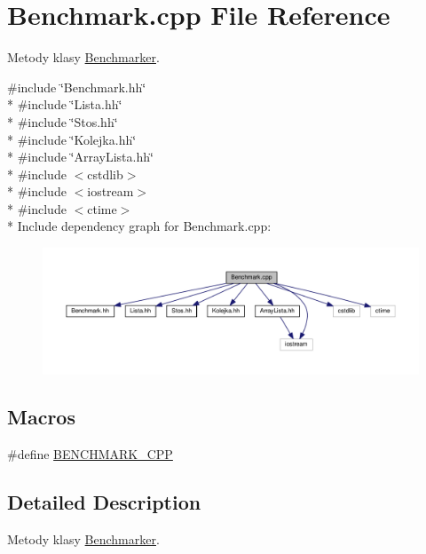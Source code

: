 \hypertarget{a00008}{}\section{Benchmark.\+cpp File Reference}
\label{a00008}


Metody klasy \hyperlink{a00002}{Benchmarker}.  


{\ttfamily \#include \char`\"{}Benchmark.\+hh\char`\"{}}\\*
{\ttfamily \#include \char`\"{}Lista.\+hh\char`\"{}}\\*
{\ttfamily \#include \char`\"{}Stos.\+hh\char`\"{}}\\*
{\ttfamily \#include \char`\"{}Kolejka.\+hh\char`\"{}}\\*
{\ttfamily \#include \char`\"{}Array\+Lista.\+hh\char`\"{}}\\*
{\ttfamily \#include $<$cstdlib$>$}\\*
{\ttfamily \#include $<$iostream$>$}\\*
{\ttfamily \#include $<$ctime$>$}\\*
Include dependency graph for Benchmark.\+cpp\+:\nopagebreak
\begin{figure}[H]
\begin{center}
\leavevmode
\includegraphics[width=350pt]{a00022}
\end{center}
\end{figure}
\subsection*{Macros}
\begin{DoxyCompactItemize}
\item 
\#define \hyperlink{a00008_af899221e0ac3b868dd9a8298bd9b1f12}{B\+E\+N\+C\+H\+M\+A\+R\+K\+\_\+\+C\+P\+P}
\end{DoxyCompactItemize}


\subsection{Detailed Description}
Metody klasy \hyperlink{a00002}{Benchmarker}. 


